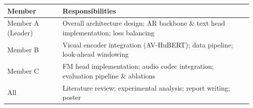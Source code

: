 \documentclass{article}
\begin{document}
\begin{table}[h]
\centering
\small
\begin{tabular}{@{}ll@{}}
\toprule
\textbf{Member} & \textbf{Responsibilities} \\
\midrule
Member A (Leader) & Overall architecture design; AR backbone \& text head implementation; loss balancing \\
Member B & Visual encoder integration (AV-HuBERT); data pipeline; look-ahead windowing \\
Member C & FM head implementation; audio codec integration; evaluation pipeline \& ablations \\
\midrule
All & Literature review; experimental analysis; report writing; poster \\
\bottomrule
\end{tabular}
\end{table}



\end{document}
